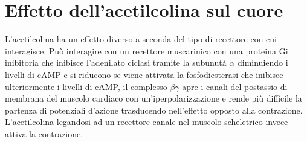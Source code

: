 \section{Effetto dell'acetilcolina sul cuore}
L'acetilcolina ha un effetto diverso a seconda del tipo di recettore con cui interagisce. Pu\`o interagire con un recettore muscarinico con una proteina Gi inibitoria che inibisce 
l'adenilato ciclasi tramite la subunut\`a $\alpha$ diminuiendo i livelli di cAMP e si riducono se viene attivata la fosfodiesterasi che inibisce ulteriormente i livelli di cAMP, il 
complesso $\beta\gamma$ apre i canali del postassio di membrana del muscolo cardiaco con un'iperpolarizzazione e rende pi\`u difficile la partenza di potenziali d'azione trasducendo 
nell'effetto opposto alla contrazione. L'acetilcolina legandosi ad un recettore canale nel muscolo scheletrico invece attiva la contrazione.
